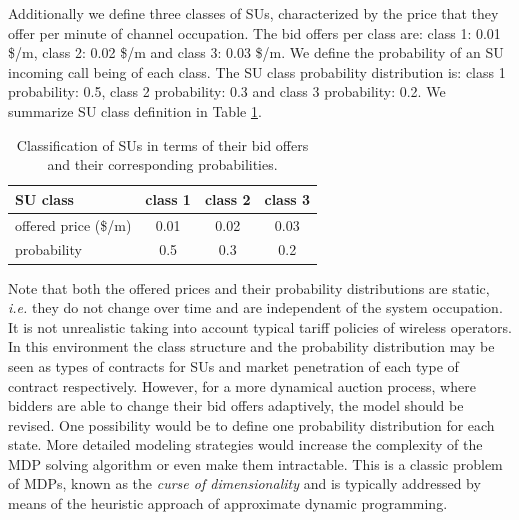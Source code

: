 Additionally we define three classes of SUs, characterized by the price that they offer per minute of channel occupation. The bid offers per class are: class 1: 0.01 \$/m, class 2: 0.02 \$/m and class 3: 0.03 \$/m. We define the probability of an SU incoming call being of each class. The SU class probability distribution is: class 1 probability: 0.5, class 2 probability: 0.3 and class 3 probability: 0.2. We summarize SU class definition in Table \ref{tab:table2}.

\begin{table}[h]
\centering
\begin{tabular}{lccc} \hline
 \textbf{SU class} & \textbf{class 1} & \textbf{class 2} & \textbf{class 3}\\\hline
offered price (\$/m) & 0.01 & 0.02 & 0.03\\
probability & 0.5 & 0.3 & 0.2\\\hline
\end{tabular}
\caption{Classification of SUs in terms of their bid offers and their corresponding probabilities.}\label{tab:table2}
\centering
\end{table}
Note that both the offered prices and their probability distributions are static, \textit{i.e.} they do not change over time and are independent of the system occupation. It is not unrealistic taking into account typical tariff policies of wireless operators. In this environment the class structure and the probability distribution may be seen as types of contracts for SUs and market penetration of each type of contract respectively. However, for a more dynamical auction process, where bidders are able to change their bid offers adaptively, the model should be revised. One possibility would be to define one probability distribution for each state. More detailed modeling strategies would increase the complexity of the MDP solving algorithm or even make them intractable. This is a classic problem of MDPs, known as the \textit{curse of dimensionality} and is typically addressed by means of the heuristic approach of approximate dynamic programming.

